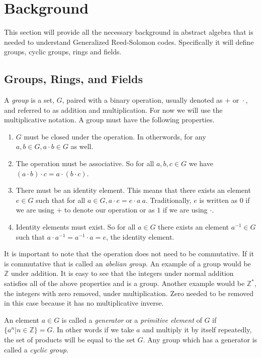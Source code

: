 \documentclass{article}
\begin{document}
\section{Background}
This section will provide all the necessary background in abstract algebra that is needed to understand Generalized Reed-Solomon codes. Specifically it will define groups, cyclic groups, rings and fields. %

\subsection{Groups, Rings, and Fields}
A \textit{group} is a set, $G$, paired with a binary operation, usually denoted as $+ \text{ or } \cdot$, and referred to as addition and multiplication. For now we will use the multiplicative notation. A group must have the following properties.
\begin{enumerate}
  \item $G$ must be closed under the operation. In otherwords, for any $a, b \in G, a \cdot b \in G$ as well.
  \item The operation must be associative. So for all $a,b,c \in G$ we have $(a \cdot b) \cdot c = a \cdot (b \cdot c)$.
  \item There must be an identity element. This means that there exists an element $e \in G$ such that for all $a \in G, a \cdot e = e \cdot a \ a$. Traditionally, $e$ is written as $0$ if we are using $+$ to denote our operation or as $1$ if we are using $\cdot$.
  \item Identity elements must exist. So for all $a \in G$ there exists an element $a^{-1} \in G$ such that $a \cdot a^{-1} = a^{-1} \cdot a = e$, the identity element.
\end{enumerate}
It is important to note that the operation does not need to be commutative. If it is commutative that is called an \textit{abelian group}. An example of a group would be $\mathbb{Z}$ under addition. It is easy to see that the integers under normal addition satisfies all of the above properties and is a group. Another example would be $\mathbb{Z}^{*}$, the integers with zero removed, under multiplication. Zero needed to be removed in this case because it has no multiplicative inverse.

An element $a \in G$ is called a \textit{generator} or a \textit{primitive element} of $G$ if $\{a^{n} | n \in \mathbb{Z}\} = G$. In other words if we take $a$ and multiply it by itself repeatedly, the set of products will be equal to the set $G$. Any group which has a generator is called a \textit{cyclic group}.
\end{document}
